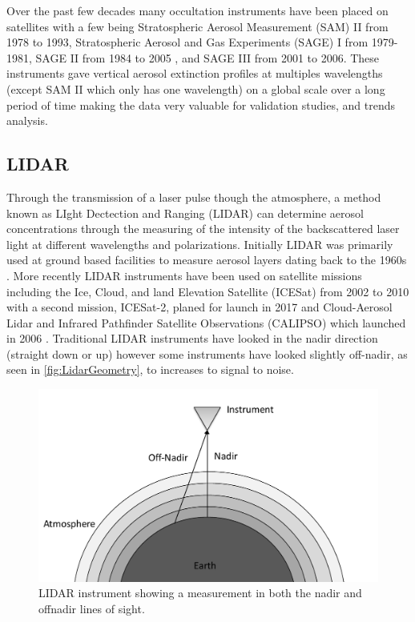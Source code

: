 Over the past few decades many occultation instruments have been placed on satellites with a few being Stratospheric Aerosol Measurement (SAM) II from 1978 to 1993, Stratospheric Aerosol and Gas Experiments (SAGE) I \citep{McCormick1979} from 1979-1981, SAGE II \citep{McCormick1987} from 1984 to 2005 , and SAGE III \citep{Thomason2003} from 2001 to 2006. These instruments gave vertical aerosol extinction profiles at multiples wavelengths (except SAM II which only has one wavelength) on a global scale over a long period of time making the data very valuable for validation studies, and trends analysis.

\subsection{LIDAR}

Through the transmission of a laser pulse though the atmosphere, a method known as LIght Dectection and Ranging (LIDAR) can determine aerosol concentrations through the measuring of the intensity of the backscattered laser light at different wavelengths and polarizations. Initially LIDAR was primarily used at ground based facilities to measure aerosol layers dating back to the 1960s \citep{Fiocco1964}. More recently LIDAR instruments have been used on satellite missions including the Ice, Cloud, and land Elevation Satellite (ICESat) from 2002 to 2010 \citep{Schutz2005} with a second mission, ICESat-2, planed for launch in 2017 and Cloud-Aerosol Lidar and Infrared Pathfinder Satellite Observations (CALIPSO) which launched in 2006 \citep{Winker2007}. Traditional LIDAR instruments have looked in the nadir direction (straight down or up) however some instruments have looked slightly off-nadir, as seen in \autoref{fig:LidarGeometry}, to increases to signal to noise.

\begin{figure}[h]
    \includegraphics[width=1.0\textwidth]{./Images/LidarGeometry.pdf}
    \caption[LIDAR Geometry]{LIDAR instrument showing a measurement in both the nadir and offnadir lines of sight.}
    \label{fig:LidarGeometry}
\end{figure}

